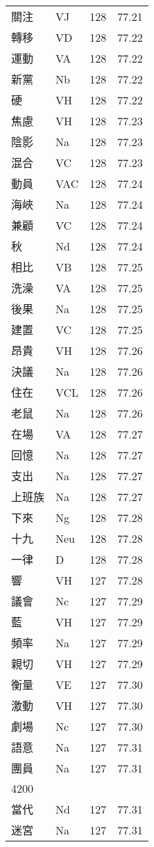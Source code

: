 \documentclass[twocolumn]{book}
\begin{document}
\begin{supertabular}{llrr}
關注 & VJ & 128 &  77.21\\
轉移 & VD & 128 &  77.22\\
運動 & VA & 128 &  77.22\\
新黨 & Nb & 128 &  77.22\\
硬 & VH & 128 &  77.22\\
焦慮 & VH & 128 &  77.23\\
陰影 & Na & 128 &  77.23\\
混合 & VC & 128 &  77.23\\
動員 & VAC & 128 &  77.24\\
海峽 & Na & 128 &  77.24\\
兼顧 & VC & 128 &  77.24\\
秋 & Nd & 128 &  77.24\\
相比 & VB & 128 &  77.25\\
洗澡 & VA & 128 &  77.25\\
後果 & Na & 128 &  77.25\\
建置 & VC & 128 &  77.25\\
昂貴 & VH & 128 &  77.26\\
決議 & Na & 128 &  77.26\\
住在 & VCL & 128 &  77.26\\
老鼠 & Na & 128 &  77.26\\
在場 & VA & 128 &  77.27\\
回憶 & Na & 128 &  77.27\\
支出 & Na & 128 &  77.27\\
上班族 & Na & 128 &  77.27\\
下來 & Ng & 128 &  77.28\\
十九 & Neu & 128 &  77.28\\
一律 & D & 128 &  77.28\\
響 & VH & 127 &  77.28\\
議會 & Nc & 127 &  77.29\\
藍 & VH & 127 &  77.29\\
頻率 & Na & 127 &  77.29\\
親切 & VH & 127 &  77.29\\
衡量 & VE & 127 &  77.30\\
激動 & VH & 127 &  77.30\\
劇場 & Nc & 127 &  77.30\\
語意 & Na & 127 &  77.31\\
團員 & Na & 127 &  77.31\\
4200\\
當代 & Nd & 127 &  77.31\\
迷宮 & Na & 127 &  77.31\\

\end{supertabular}
\end{document}
